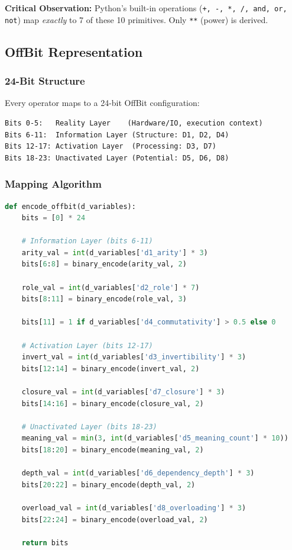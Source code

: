 \textbf{Critical Observation:} Python's built-in operations (\texttt{+, -, *, /, and, or, not}) map \emph{exactly} to 7 of these 10 primitives. Only \texttt{**} (power) is derived.

\subsection{OffBit Representation}

\subsubsection{24-Bit Structure}

Every operator maps to a 24-bit OffBit configuration:

\begin{verbatim}
Bits 0-5:   Reality Layer    (Hardware/IO, execution context)
Bits 6-11:  Information Layer (Structure: D1, D2, D4)
Bits 12-17: Activation Layer  (Processing: D3, D7)
Bits 18-23: Unactivated Layer (Potential: D5, D6, D8)
\end{verbatim}

\subsubsection{Mapping Algorithm}

\begin{lstlisting}[language=Python, caption=OffBit Encoding Algorithm]
def encode_offbit(d_variables):
    bits = [0] * 24
    
    # Information Layer (bits 6-11)
    arity_val = int(d_variables['d1_arity'] * 3)
    bits[6:8] = binary_encode(arity_val, 2)
    
    role_val = int(d_variables['d2_role'] * 7)
    bits[8:11] = binary_encode(role_val, 3)
    
    bits[11] = 1 if d_variables['d4_commutativity'] > 0.5 else 0
    
    # Activation Layer (bits 12-17)
    invert_val = int(d_variables['d3_invertibility'] * 3)
    bits[12:14] = binary_encode(invert_val, 2)
    
    closure_val = int(d_variables['d7_closure'] * 3)
    bits[14:16] = binary_encode(closure_val, 2)
    
    # Unactivated Layer (bits 18-23)
    meaning_val = min(3, int(d_variables['d5_meaning_count'] * 10))
    bits[18:20] = binary_encode(meaning_val, 2)
    
    depth_val = int(d_variables['d6_dependency_depth'] * 3)
    bits[20:22] = binary_encode(depth_val, 2)
    
    overload_val = int(d_variables['d8_overloading'] * 3)
    bits[22:24] = binary_encode(overload_val, 2)
    
    return bits
\end{lstlisting}

